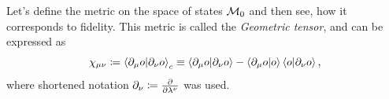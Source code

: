 Let's define the metric on the space of states $\mathcal{M}_0$ and then see, how it corresponds to fidelity. This metric is called the \emph{Geometric tensor}, and can be expressed as 
\begin{equation}
    \chi_{\mu\nu}\coloneqq \braket{\partial_\mu o|\partial_\nu o}_c \equiv \braket{\partial_\mu o|\partial_\nu o} - \braket{\partial_\mu o|o}\braket{o|\partial_\nu o},
    \label{eq:geometricTensor}
\end{equation}
where shortened notation $\partial_\nu\coloneqq\frac{\partial }{\partial \lambda^\nu}$ was used. 


